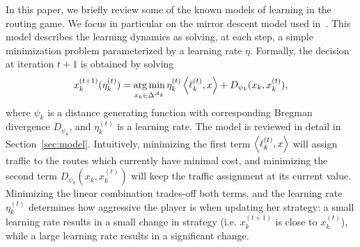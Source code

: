 \documentclass{sig-alternate-ipsn13}
\begin{document}
In this paper, we briefly review some of the known models of learning in the routing game. We focus in particular on the mirror descent model used in~\cite{krichene2015MD}. This model describes the learning dynamics as solving, at each step, a simple minimization problem parameterized by a learning rate $\eta$. Formally, the decision at iteration $t+1$ is obtained by solving
\[
x^{(t+1)}_k(\eta^{(t)}_k) = \operatorname*{arg\,min}_{x_k \in \Delta^{\mathcal{A}_k}} \eta^{(t)}_k\left\langle \ell^{(t)}_k, x \right\rangle + D_{\psi_k}(x_k, x^{(t)}_k),
\]
where $\psi_k$ is a distance generating function with corresponding Bregman divergence $D_{\psi_k}$, and $\eta^{(t)}_k$ is a learning rate. The model is reviewed in detail in Section~\ref{sec:model}. Intuitively, minimizing the first term $\left\langle \ell^{(t)}_k, x \right\rangle$ will assign traffic to the routes which currently have minimal cost, and minimizing the second term $D_{\psi_k}(x_k, x^{(t)}_k)$ will keep the traffic assignment at its current value. Minimizing the linear combination trades-off both terms, and the learning rate $\eta_k^{(t)}$ determines how aggressive the player is when updating her strategy: a small learning rate results in a small change in strategy (i.e. $x^{(t+1)}_k$ is close to $x_k^{(t)}$), while a large learning rate results in a significant change.
\end{document}
